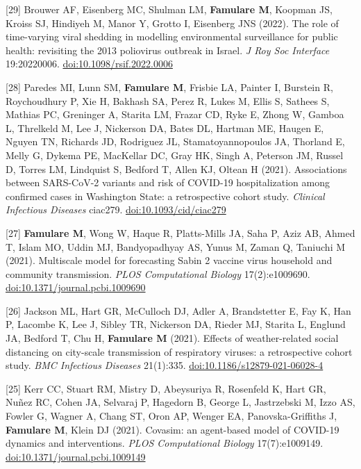 \documentclass{article}
\begin{document}
\begin{llist}
\begin{items}
\item[{[29]}] Brouwer AF, Eisenberg MC, Shulman LM, \textbf{Famulare M}, Koopman JS, Kroiss SJ, Hindiyeh M, Manor Y, Grotto I, Eisenberg JNS (2022). The role of time-varying viral shedding in modelling environmental surveillance for public health: revisiting the 2013 poliovirus outbreak in Israel. \emph{J Roy Soc Interface} 19:20220006. \href{https://doi.org/10.1098/rsif.2022.0006}{doi:10.1098/rsif.2022.0006}

\item[{[28]}] Paredes MI, Lunn SM, \textbf{Famulare M}, Frisbie LA, Painter I, Burstein R, Roychoudhury P, Xie H, Bakhash SA, Perez R, Lukes M, Ellis S, Sathees S, Mathias PC, Greninger A, Starita LM, Frazar CD, Ryke E, Zhong W, Gamboa L, Threlkeld M, Lee J, Nickerson DA, Bates DL, Hartman ME, Haugen E, Nguyen TN, Richards JD, Rodriguez JL, Stamatoyannopoulos JA, Thorland E, Melly G, Dykema PE, MacKellar DC, Gray HK, Singh A, Peterson JM, Russel D, Torres LM, Lindquist S, Bedford T, Allen KJ, Oltean H (2021). Associations between SARS-CoV-2 variants and risk of COVID-19 hospitalization among confirmed cases in Washington State: a retrospective cohort study. \emph{Clinical Infectious Diseases} ciac279. \href{https://doi.org/10.1093/cid/ciac279}{doi:10.1093/cid/ciac279}

\item[{[27]}] \textbf{Famulare M}, Wong W, Haque R, Platts-Mills JA, Saha P, Aziz AB, Ahmed T, Islam MO, Uddin MJ, Bandyopadhyay AS, Yunus M, Zaman Q, Taniuchi M (2021). Multiscale model for forecasting Sabin 2 vaccine virus household and community transmission. \emph{PLOS Computational Biology} 17(2):e1009690. \href{https://doi.org/10.1371/journal.pcbi.1009690}{doi:10.1371/journal.pcbi.1009690}

\item[{[26]}] Jackson ML, Hart GR, McCulloch DJ, Adler A, Brandstetter E, Fay K, Han P, Lacombe K, Lee J, Sibley TR, Nickerson DA, Rieder MJ, Starita L, Englund JA, Bedford T, Chu H, \textbf{Famulare M} (2021). Effects of weather-related social distancing on city-scale transmission of respiratory viruses: a retrospective cohort study. \emph{BMC Infectious Diseases} 21(1):335. \href{https://bmcinfectdis.biomedcentral.com/articles/10.1186/s12879-021-06028-4}{doi:10.1186/s12879-021-06028-4}

\item[{[25]}] Kerr CC, Stuart RM, Mistry D, Abeysuriya R, Rosenfeld K, Hart GR, Nu\~{n}ez RC, Cohen JA, Selvaraj P, Hagedorn B, George L, Jastrzebski M, Izzo AS, Fowler G, Wagner A, Chang ST, Oron AP, Wenger EA, Panovska-Griffiths J, \textbf{Famulare M}, Klein DJ (2021). Covasim: an agent-based model of COVID-19 dynamics and interventions. \emph{PLOS Computational Biology} 17(7):e1009149. \href{https://doi.org/10.1371/journal.pcbi.1009149}{doi:10.1371/journal.pcbi.1009149}


\end{items}
\end{llist}
\end{document}
